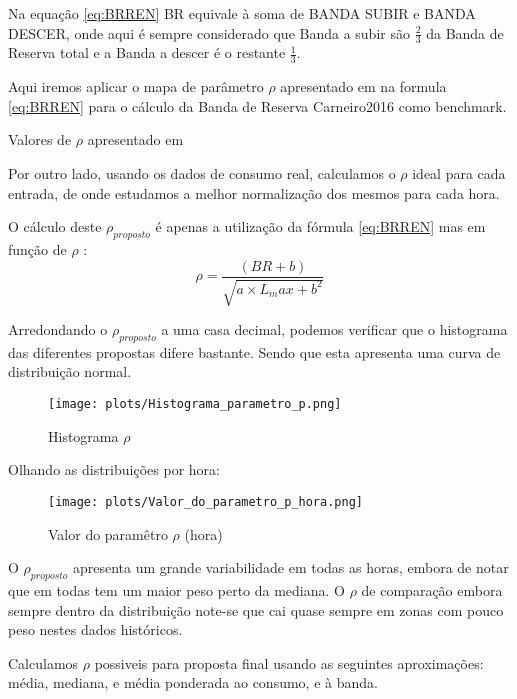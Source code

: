 Na equação \ref{eq:BRREN} BR equivale à soma de BANDA SUBIR e BANDA DESCER, onde aqui é sempre considerado que Banda a subir são $\frac{2}{3}$ da Banda de Reserva total e a Banda a descer é o restante $\frac{1}{3}$.\par
Aqui iremos aplicar o mapa de parâmetro $\rho$ apresentado em \cite{Carneiro2016} na formula \ref{eq:BRREN} para o cálculo da Banda de Reserva Carneiro2016 como benchmark.\par

\begin{table}[H] \centering \caption{Valores de $\rho$ apresentado em \cite{Carneiro2016}}  \end{table}


Por outro lado, usando os dados de consumo real, calculamos o $\rho$ ideal para cada entrada, de onde estudamos a melhor normalização dos mesmos para cada hora.\par
O cálculo deste $\rho_{proposto}$ é apenas a utilização da fórmula \ref{eq:BRREN} mas em função de $\rho$ : \\

\begin{equation} \label{eq:rhoproposed} 
    \rho  = \frac{(BR + b)}{\sqrt{a \times L_max + b^{2}}}
\end{equation}


Arredondando o $\rho_{proposto}$ a uma casa decimal, podemos verificar que o histograma das diferentes propostas difere bastante. Sendo que esta apresenta uma curva de distribuição normal.\par


\begin{figure}[H]
    \centering
    \texttt{[image: plots/Histograma\_parametro\_p.png]}
    \caption{Histograma $\rho$}
  \end{figure}


Olhando as distribuições por hora: \\

\begin{figure}[H]
    \centering
    \texttt{[image: plots/Valor\_do\_parametro\_p\_hora.png]}
    \caption{Valor do paramêtro $\rho$ (hora)}
  \end{figure}

O $\rho_{proposto}$ apresenta um grande variabilidade em todas as horas, embora de notar que em todas tem um maior peso perto da mediana. O $\rho$ de comparação embora sempre dentro da distribuição note-se que cai quase sempre em zonas com pouco peso nestes dados históricos.\par
Calculamos $\rho$ possiveis para proposta final usando as seguintes aproximações: média, mediana, e média ponderada ao consumo, e à banda.\par


